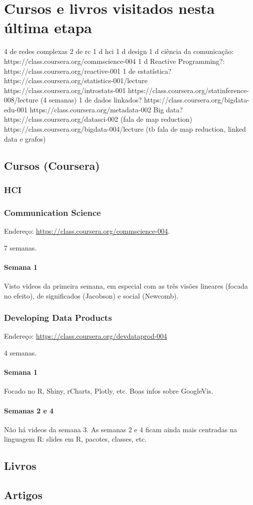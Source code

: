 \documentclass[12pt]{report}
\begin{document}
\part{Cursos e livros visitados nesta última etapa}
4 de redes complexas
2 de rc
1 d hci
1 d design
1 d ciência da comunicação:
https://class.coursera.org/commscience-004
1 d Reactive Programming?:
https://class.coursera.org/reactive-001
1 de estatística?
https://class.coursera.org/statistics-001/lecture
https://class.coursera.org/introstats-001
https://class.coursera.org/statinference-008/lecture (4 semanas)
1 de dados linkados?
https://class.coursera.org/bigdata-edu-001
https://class.coursera.org/metadata-002
Big data?
https://class.coursera.org/datasci-002 (fala de map reduction)
https://class.coursera.org/bigdata-004/lecture (tb fala de map reduction, linked data e grafos)
\chapter{Cursos (Coursera)}
\section{HCI}
\section{Communication Science}
Endereço: \url{https://class.coursera.org/commscience-004}.

7 semanas.
\subsection{Semana 1}
Visto videos da primeira semana, em especial com as três visões lineares (focada no efeito), de significados (Jacobson) e social (Newcomb).
\section{Developing Data Products}
Endereço: \url{https://class.coursera.org/devdataprod-004}

4 semanas.
\subsection{Semana 1}
Focado no R, Shiny, rCharts, Plotly, etc. Boas infos sobre GoogleVis.
\subsection{Semanas 2 e 4}
Não há videos da semana 3. As semanas 2 e 4 ficam ainda mais centradas na linguagem R: slides em R, pacotes, classes, etc.
\chapter{Livros}
\chapter{Artigos}
\newpage

\newpage

\newpage
\printindex
\newpage
%
\appendix
\end{document}
